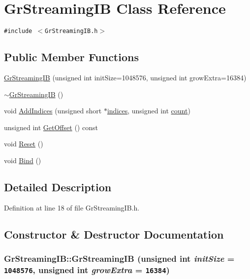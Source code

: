 \hypertarget{class_gr_streaming_i_b}{
\section{GrStreamingIB Class Reference}
\label{class_gr_streaming_i_b}
}
{\tt \#include $<$GrStreamingIB.h$>$}

\subsection*{Public Member Functions}
\begin{CompactItemize}
\item 
\hyperlink{class_gr_streaming_i_b_4c885d210e09d04eabc5cf9fd1c431ab}{GrStreamingIB} (unsigned int initSize=1048576, unsigned int growExtra=16384)
\item 
\hyperlink{class_gr_streaming_i_b_cca352c18f9ddb0e4f0be0ebbbb23519}{$\sim$GrStreamingIB} ()
\item 
void \hyperlink{class_gr_streaming_i_b_af3e53f7c40298169bcaf4b342cbecaf}{AddIndices} (unsigned short $\ast$\hyperlink{glext__bak_8h_c4293d0f76770fe857be3431df25308d}{indices}, unsigned int \hyperlink{wglext_8h_98d18d6b4e3ba4ed266c6fb54c839d70}{count})
\item 
unsigned int \hyperlink{class_gr_streaming_i_b_6ebe51c20516af70e2beb954a402d7c2}{GetOffset} () const 
\item 
void \hyperlink{class_gr_streaming_i_b_e5c7eb6fe055047ab7cba1720c15d67c}{Reset} ()
\item 
void \hyperlink{class_gr_streaming_i_b_a01b21e6d8ca9f23938fe4c6a02ba11e}{Bind} ()
\end{CompactItemize}


\subsection{Detailed Description}


Definition at line 18 of file GrStreamingIB.h.

\subsection{Constructor \& Destructor Documentation}
\hypertarget{class_gr_streaming_i_b_4c885d210e09d04eabc5cf9fd1c431ab}{
\subsubsection[{GrStreamingIB}]{\setlength{\rightskip}{0pt plus 5cm}GrStreamingIB::GrStreamingIB (unsigned int {\em initSize} = {\tt 1048576}, \/  unsigned int {\em growExtra} = {\tt 16384})}}
\label{class_gr_streaming_i_b_4c885d210e09d04eabc5cf9fd1c431ab}




